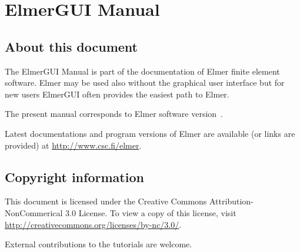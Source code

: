 \chapter*{ElmerGUI Manual}

\section*{About this document}

The ElmerGUI Manual is part of the documentation of Elmer finite element software. 
Elmer may be used also without the graphical user interface but for new 
users ElmerGUI often provides the easiest path to Elmer. 

The present manual corresponds to Elmer software version~\elmerversion{}.

Latest documentations and program versions of Elmer are available (or links are provided) at 
\url{http://www.csc.fi/elmer}. 

\section*{Copyright information}

This document is licensed under the Creative Commons Attribution-NonCommerical 3.0 License. 
To view a copy of this license, visit \url{http://creativecommons.org/licenses/by-nc/3.0/}.

External contributions to the tutorials are welcome. 


